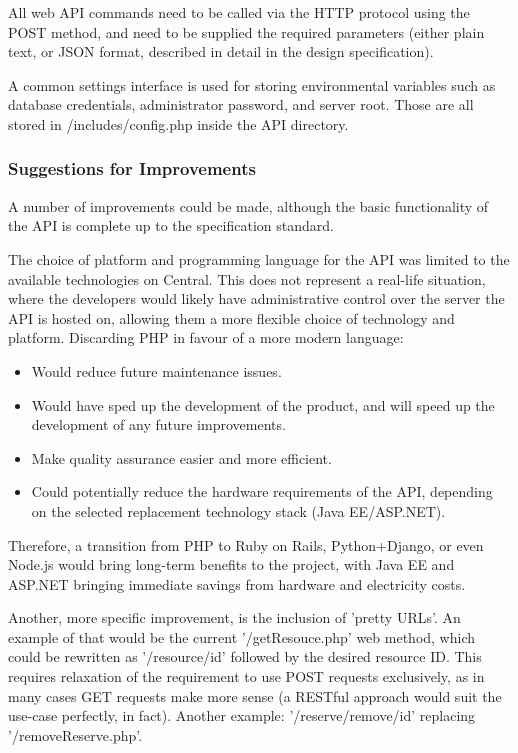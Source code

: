     All web API commands need to be called via the HTTP protocol using the POST
    method, and need to be supplied the required parameters (either plain text,
    or JSON format, described in detail in the design specification).
	
	A common settings interface is used for storing environmental variables 
	such as database credentials, administrator password, and server root.
	Those are all stored in /includes/config.php inside the API
	directory.

    \subsubsection{Suggestions for Improvements}

A number of improvements could be made, although the basic functionality of
	the API is complete up to the specification standard.
	
	The choice of platform and programming language for the API was limited to 
	the available technologies on Central. This does not represent a real-life
	situation, where the developers would likely have administrative control
	over the server the API is hosted on, allowing them a more flexible choice
	of technology and platform. Discarding PHP in favour of a more modern
	language: 
        \begin{itemize}
            \item Would reduce future maintenance issues.
            \item Would have sped up the development of the product, and will speed up
	   the development of any future improvements.
            \item Make quality assurance easier and more efficient.
            \item Could potentially reduce the hardware requirements of the API,
	   depending on the selected replacement technology stack (Java EE/ASP.NET).

        \end{itemize}

	Therefore, a transition from PHP to Ruby on Rails, Python+Django, or even 
	Node.js would bring long-term benefits to the project, with Java EE and 
	ASP.NET bringing immediate savings from hardware and electricity costs.
	
	Another, more specific improvement, is the inclusion of 'pretty URLs'.
	An example of that would be the current '/getResouce.php' web method, which 
	could be rewritten as '/resource/{id}' followed by the desired resource ID.
	This requires relaxation of the requirement to use POST requests 
	exclusively, as in many cases GET requests make more sense (a RESTful 
	approach would suit the use-case perfectly, in fact).
	Another example: '/reserve/remove/{id}' replacing '/removeReserve.php'.


